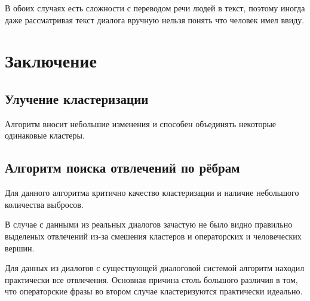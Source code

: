 \documentclass[specification,annotation]{itmo-student-thesis}
\begin{document}
	В обоих случаях есть сложности с переводом речи людей в текст, поэтому иногда даже рассматривая текст диалога вручную нельзя понять что человек имел ввиду.
	
	\chapter{Заключение}
	\section{Улучение кластеризации}
	Алгоритм вносит небольшие изменения и способен объединять некоторые одинаковые кластеры.
	
	\section{Алгоритм поиска отвлечений по рёбрам}
	Для данного алгоритма критично качество кластеризации и наличие небольшого количества выбросов. 
	
	В случае с данными из реальных диалогов зачастую не было видно правильно выделеных отвлечений из-за смешения кластеров и операторских и человеческих вершин.
	
	Для данных из диалогов с существующей диалоговой системой алгоритм находил практически все отвлечения. Основная причина столь большого различия в том, что операторские фразы во втором случае кластеризуются практически идеально.
	
	
	
	
\end{document}

